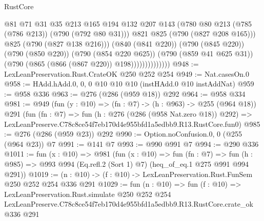 \begin{lexlean}{RustCore}
\begin{coremodule}
                                @81
                                @71
                                @31
                                @35
                                @213
                                @165
                                @194
                                @132
                                @207
                                @143
                                (@780 @80 @213 (@785 (@786 @213)) (@790 (@792 @80 @31)))
                                @821
                                @825
                                (@790 (@827 @208 @165)))
                              @825
                              (@790 (@827 @138 @216)))
                            (@840 (@841 @220))
                            (@790 (@845 @220))
                            (@790 (@850 @220))
                            (@790 (@854 @220 @625))
                            (@790 (@859 @41 @625 @31))
                            (@790 (@865 (@866 (@867 @220)) @198))))))))))))))
@948 := LexLeanPreservation.Rust.CrateOK @250 @252 @254
@949 := Nat.casesOn.{0}
@958 := HAdd.hAdd.{0, 0, 0} @10 @10 @10 (instHAdd.{0} @10 instAddNat)
@959 := @958 @336
@963 := @276 (@286 (@959 @18)) @292
@964 := @958 @334
@981 := @949
    (fun (y : @10) => (fn : @7) -> (h : @963) -> @255 (@964 @18))
    @291
    (fun (fn : @7) =>
    fun (h : @276 (@286 (@958 Nat.zero @18)) @292) =>
    LexLeanPreserve.C78c8ce54f7eb170d4e955bfd1a5edbb9.R13.RustCore.fun0)
@985 := @276 (@286 (@959 @23)) @292
@990 := Option.noConfusion.{0, 0} (@255 (@964 @23)) @7
@991 := @141 @7
@993 := @990 @991 @7
@994 := @290 @336
@1011 := fun (x : @10) =>
  @981
    (fun (x : @10) =>
    fun (fn : @7) =>
    fun (h : @985) => @993 @994 (Eq.refl.{2} (Sort 1) @7) (heq_of_eq.{1} @275 @991 @994 @291))
@1019 := (n : @10) -> (f : @10) -> LexLeanPreservation.Rust.FunSem @250 @252 @254 @336 @291
@1029 := fun (n : @10) =>
  fun (f : @10) =>
  LexLeanPreservation.Rust.simulate
    @250
    @252
    @254
    LexLeanPreserve.C78c8ce54f7eb170d4e955bfd1a5edbb9.R13.RustCore.crate_ok
    @336
    @291
\end{coremodule}
\end{lexlean}
